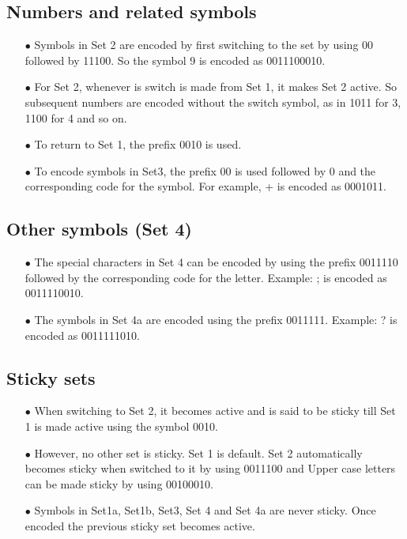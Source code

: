 \documentclass[]{article}
\begin{document}
\subsection{Numbers and related symbols}
\begin{itemize}
	\item[$\bullet$] Symbols in Set 2 are encoded by first switching to the set by using 00 followed by 11100.  So the symbol 9 is encoded as 0011100010.
	\item[$\bullet$] For Set 2, whenever is switch is made from Set 1, it makes Set 2 active. So subsequent numbers are encoded without the switch symbol, as in 1011 for 3, 1100 for 4 and so on.
	\item[$\bullet$] To return to Set 1, the prefix 0010 is used.
	\item[$\bullet$] To encode symbols in Set3, the prefix 00 is used followed by 0 and the corresponding code for the symbol.  For example, + is encoded as 0001011.
\end{itemize}

\subsection{Other symbols (Set 4)}
\begin{itemize}
	\item[$\bullet$] The special characters in Set 4 can be encoded by using the prefix 0011110 followed by the corresponding code for the letter.  Example: ; is encoded as 0011110010.
	\item[$\bullet$] The symbols in Set 4a are encoded using the prefix 0011111. Example: ? is encoded as 0011111010.
\end{itemize}

\subsection{Sticky sets}
\begin{itemize}
	\item[$\bullet$] When switching to Set 2, it becomes active and is said to be sticky till Set 1 is made active using the symbol 0010.
	\item[$\bullet$] However, no other set is sticky. Set 1 is default. Set 2 automatically becomes sticky when switched to it by using 0011100 and Upper case letters can be made sticky by using 00100010.
    \item[$\bullet$] Symbols in Set1a, Set1b, Set3, Set 4 and Set 4a are never sticky. Once encoded the previous sticky set becomes active.
\end{itemize}
\end{document}
